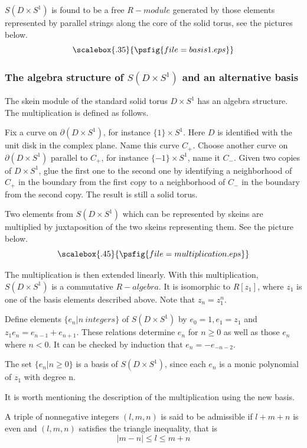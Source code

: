 $S(D\times S^1)$ is found to be a free  $R-module$
generated by those elements represented by parallel strings along
the core of the solid torus, see the pictures below.
\[\scalebox{.35}{\psfig{file=basis1.eps}}\]
\subsubsection{The algebra structure of $S(D\times S^1)$ and an alternative basis}\label{algebra and new basis}
The skein module of the standard solid torus $D\times S^1$ has an
algebra structure. The multiplication is defined as follows.

Fix a curve on $\partial(D\times S^1)$, for instance $\{1\}\times S^1$. Here $D$ is identified with the unit disk in the complex plane. Name this curve $C_+$.
Choose another curve on $\partial(D\times S^1)$ parallel to $C_+$, for instance
$\{-1\}\times S^1$, name it  $C_-$. Given two copies of $D\times
S^1$, glue the first one to the second one by identifying a neighborhood
of $C_+$ in the boundary from the first copy to a neighborhood of
$C_-$ in the boundary from the second copy. The result is still a solid
torus.

Two elements from $S(D\times S^1)$ which can be represented by skeins are multiplied by juxtaposition of the two skeins representing them. See the picture below.
\[\scalebox{.45}{\psfig{file=multiplication.eps}} \]

The multiplication is then extended linearly. With this
multiplication, $S(D\times S^1)$ is a commutative $R-algebra$.
It is isomorphic to $R[z_1]$, where $z_1$ is one of the basis
elements described above. Note that $z_n=z_1^n$.

 Define elements $\{e_n|n\ integers\}$ of $S(D\times S^1)$ by $e_0=1,e_1=z_1$ and $z_1e_n=e_{n-1}+e_{n+1}$.
These relations determine $e_n$ for $n\ge 0$ as well as those $e_n$ where $n<0$. It can be checked by induction that $e_n=-e_{-n-2}$.

The set $\{e_n|n\ge 0 \}$ is a basis of
$S(D\times S^1)$, since each $e_n$ is a monic polynomial of $z_1$ with degree n.

It is worth mentioning the description of the multiplication using the new basis.

\begin{definition} A triple of nonnegative integers $(l,m,n)$ is said to be admissible if $l+m+n$ is even and $(l,m,n)$ satisfies the triangle inequality, that is \[ |m-n|\le l \le m+n\]
\end{definition}

